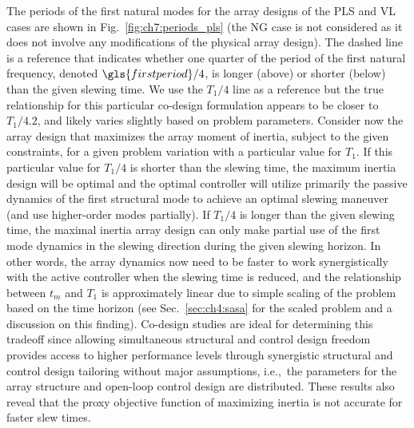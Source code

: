 The periods of the first natural modes for the array designs of the PLS and VL cases are shown in Fig.~\ref{fig:ch7:periods_pls} (the NG case is not considered as it does not involve any modifications of the physical array design). The dashed line is a reference that indicates whether one quarter of the period of the first natural frequency, denoted $\gls{firstperiod}/4$, is longer (above) or shorter (below) than the given slewing time. We use the $T_{1}/4$ line as a reference but the true relationship for this particular co-design formulation appears to be closer to $T_{1}/4.2$, and likely varies slightly based on problem parameters. Consider now the array design that maximizes the array moment of inertia, subject to the given constraints, for a given problem variation with a particular value for $T_1$. If this particular value for $T_{1}/4$ is shorter than the slewing time, the maximum inertia design will be optimal and the optimal controller will utilize primarily the passive dynamics of the first structural mode to achieve an optimal slewing maneuver (and use higher-order modes partially). If $T_{1}/4$ is longer than the given slewing time, the maximal inertia array design can only make partial use of the first mode dynamics in the slewing direction during the given slewing horizon. In other words, the array dynamics now need to be faster to work synergistically with the active controller when the slewing time is reduced, and the relationship between $t_m$ and $T_1$ is approximately linear due to simple scaling of the problem based on the time horizon (see Sec.~\ref{sec:ch4:sasa} for the scaled problem and a discussion on this finding). 
Co-design studies are ideal for determining this tradeoff since allowing simultaneous structural and control design freedom provides access to higher performance levels through synergistic structural and control design tailoring without major assumptions, i.e.,~the parameters for the array structure and open-loop control design are distributed. These results also reveal that the proxy objective function of maximizing inertia is not accurate for faster slew times.

